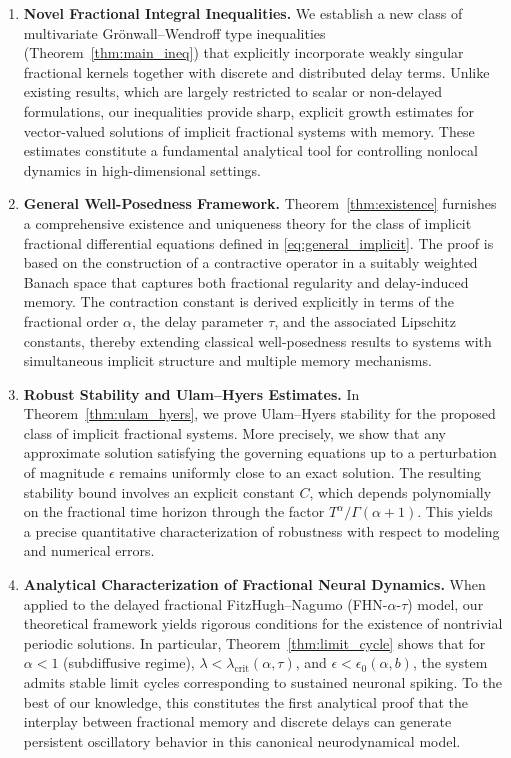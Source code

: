\documentclass[12pt,a4paper]{article}
\numberwithin{equation}{section}
\begin{document}
	\begin{enumerate}
		\item \textbf{Novel Fractional Integral Inequalities.} We establish a new class of multivariate Grönwall--Wendroff type inequalities (Theorem~\ref{thm:main_ineq}) that explicitly incorporate weakly singular fractional kernels together with discrete and distributed delay terms. Unlike existing results, which are largely restricted to scalar or non-delayed formulations, our inequalities provide sharp, explicit growth estimates for vector-valued solutions of implicit fractional systems with memory. These estimates constitute a fundamental analytical tool for controlling nonlocal dynamics in high-dimensional settings.
		
		\item \textbf{General Well-Posedness Framework.} Theorem~\ref{thm:existence} furnishes a comprehensive existence and uniqueness theory for the class of implicit fractional differential equations defined in \eqref{eq:general_implicit}. The proof is based on the construction of a contractive operator in a suitably weighted Banach space that captures both fractional regularity and delay-induced memory. The contraction constant is derived explicitly in terms of the fractional order $\alpha$, the delay parameter $\tau$, and the associated Lipschitz constants, thereby extending classical well-posedness results to systems with simultaneous implicit structure and multiple memory mechanisms.
		
		\item \textbf{Robust Stability and Ulam--Hyers Estimates.} In Theorem~\ref{thm:ulam_hyers}, we prove Ulam--Hyers stability for the proposed class of implicit fractional systems. More precisely, we show that any approximate solution satisfying the governing equations up to a perturbation of magnitude $\epsilon$ remains uniformly close to an exact solution. The resulting stability bound involves an explicit constant $C$, which depends polynomially on the fractional time horizon through the factor $T^{\alpha}/\Gamma(\alpha+1)$. This yields a precise quantitative characterization of robustness with respect to modeling and numerical errors.
		
		\item \textbf{Analytical Characterization of Fractional Neural Dynamics.} When applied to the delayed fractional FitzHugh--Nagumo (FHN-$\alpha$-$\tau$) model, our theoretical framework yields rigorous conditions for the existence of nontrivial periodic solutions. In particular, Theorem~\ref{thm:limit_cycle} shows that for $\alpha<1$ (subdiffusive regime), $\lambda<\lambda_{\mathrm{crit}}(\alpha,\tau)$, and $\epsilon<\epsilon_0(\alpha,b)$, the system admits stable limit cycles corresponding to sustained neuronal spiking. To the best of our knowledge, this constitutes the first analytical proof that the interplay between fractional memory and discrete delays can generate persistent oscillatory behavior in this canonical neurodynamical model.
		

\end{enumerate}
\end{document}
